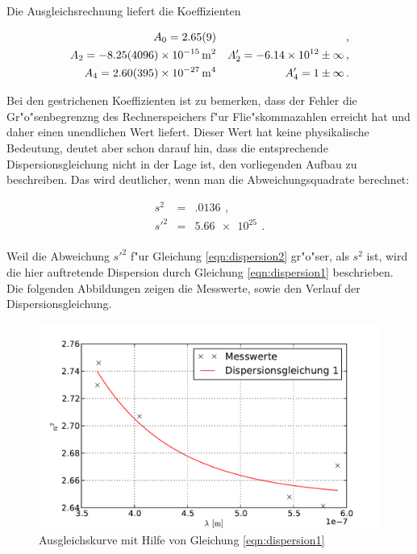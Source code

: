 		Die Ausgleichsrechnung liefert die Koeffizienten

		\begin{eqnarray*}
			A_0 = \SI{2.65 (9)}{} && \,, \\
			A_2 = \SI{-8.25(4096)e-15}{\meter \tothe{2}} && A'_2 = \SI{-6.14e12}{} \pm \infty \,, \\
			A_4 = \SI{2.60(395)e-27}{\meter \tothe{4}} && A'_4 = \SI{1}{} \pm \infty \,. \\
		\end{eqnarray*}

		Bei den gestrichenen Koeffizienten ist zu bemerken, dass der Fehler die Gr"o"senbegrenzng des Rechnerspeichers f"ur Flie"skommazahlen erreicht hat und daher einen unendlichen Wert liefert.
		Dieser Wert hat keine physikalische Bedeutung, deutet aber schon darauf hin, dass die entsprechende Dispersionsgleichung nicht in der Lage ist, den vorliegenden Aufbau zu beschreiben.
		Das wird deutlicher, wenn man die Abweichungsquadrate berechnet:

		\begin{eqnarray*}
			s^2 & = & \SI{.0136}{} \,, \\
			s'^2 & = & \SI{5.66e25}{} \,. \\
		\end{eqnarray*}

		Weil die Abweichung $s'^2$ f"ur Gleichung \eqref{eqn:dispersion2} gr"o"ser, als $s^2$ ist, wird die hier auftretende Dispersion durch Gleichung \eqref{eqn:dispersion1} beschrieben.
		Die folgenden Abbildungen zeigen die Messwerte, sowie den Verlauf der Dispersionsgleichung.

		\begin{figure}[h]
			\centering
			\includegraphics[width = 15cm]{img/dispersion1.pdf}
			\caption{Ausgleichskurve mit Hilfe von Gleichung \eqref{eqn:dispersion1} \label{fig:dispersion1}}
		\end{figure}

